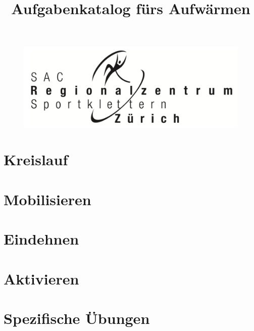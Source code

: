 \documentclass{catalogue}
\title{Aufgabenkatalog fürs Aufwärmen}
\begin{document}
    \Large
    \maketitle

    \begin{figure}
        \includegraphics[width=0.9\linewidth]{src/images/RZZ_Logo.png}
        \label{fig:RZZ_Logo}
    \end{figure}
    \newpage

    \section{Kreislauf}
        
        \newpage
    
    \section{Mobilisieren}
        
        \newpage

    \section{Eindehnen}
        
        \newpage
    
    \section{Aktivieren}
        
        \newpage

    \section{Spezifische Übungen}
        
\end{document}
